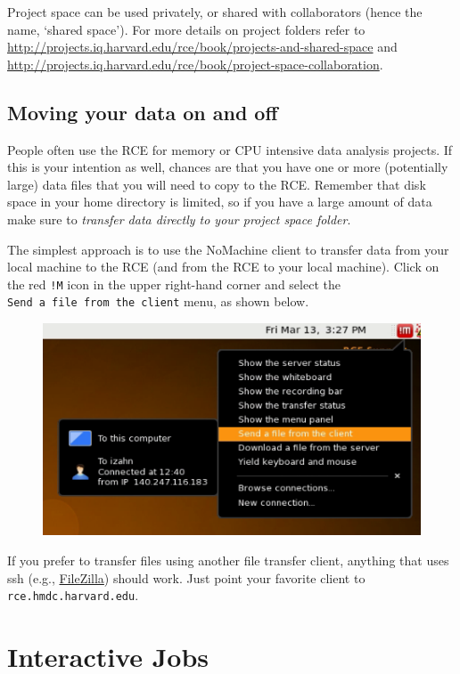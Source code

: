\documentclass[]{book}
\begin{document}
Project space can be used privately, or shared with collaborators (hence
the name, `shared space'). For more details on project folders refer to
\url{http://projects.iq.harvard.edu/rce/book/projects-and-shared-space}
and
\url{http://projects.iq.harvard.edu/rce/book/project-space-collaboration}.

\section{Moving your data on and off}\label{moving-your-data-on-and-off}

People often use the RCE for memory or CPU intensive data analysis
projects. If this is your intention as well, chances are that you have
one or more (potentially large) data files that you will need to copy to
the RCE. Remember that disk space in your home directory is limited, so
if you have a large amount of data make sure to \emph{transfer data
directly to your project space folder}.

The simplest approach is to use the NoMachine client to transfer data
from your local machine to the RCE (and from the RCE to your local
machine). Click on the red \texttt{!M} icon in the upper right-hand
corner and select the \texttt{Send\ a\ file\ from\ the\ client} menu, as
shown below.

\begin{figure}
\centering
\includegraphics{images/NoMachineMenu.png}
\caption{}
\end{figure}

If you prefer to transfer files using another file transfer client,
anything that uses ssh (e.g.,
\href{http://filezilla-project.org/}{FileZilla}) should work. Just point
your favorite client to \texttt{rce.hmdc.harvard.edu}.

\chapter{Interactive Jobs}\label{interactive-jobs}
\end{document}
